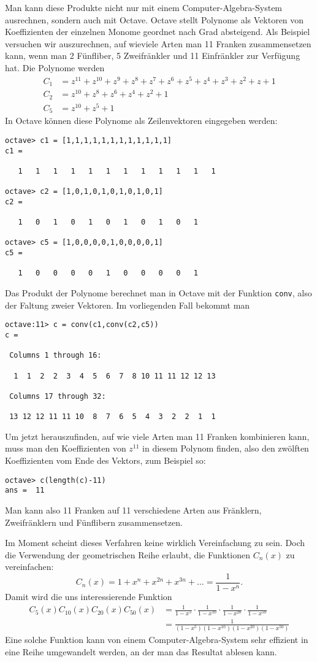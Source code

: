 Man kann diese Produkte nicht nur mit einem Computer-Algebra-System
ausrechnen, sondern auch mit Octave.
Octave stellt Polynome als
Vektoren von Koeffizienten der einzelnen Monome geordnet nach Grad
absteigend.
Als Beispiel versuchen wir auszurechnen, auf wieviele
Arten man 11 Franken zusammensetzen kann, wenn man 2 Fünfliber,
5 Zweifränkler und 11 Einfränkler zur Verfügung hat.
Die Polynome werden
\begin{align*}
C_1&=z^{11}+z^{10}+z^9+z^8+z^7+z^6+z^5+z^4+z^3+z^2+z+1\\
C_2&=z^{10}+z^8+z^6+z^4+z^2+1\\
C_5&=z^{10}+z^5+1
\end{align*}
In Octave können diese Polynome als Zeilenvektoren eingegeben werden:
\begin{verbatim}
octave> c1 = [1,1,1,1,1,1,1,1,1,1,1,1]
c1 =

   1   1   1   1   1   1   1   1   1   1   1   1

octave> c2 = [1,0,1,0,1,0,1,0,1,0,1]
c2 =

   1   0   1   0   1   0   1   0   1   0   1

octave> c5 = [1,0,0,0,0,1,0,0,0,0,1]
c5 =

   1   0   0   0   0   1   0   0   0   0   1
\end{verbatim}
Das Produkt der Polynome berechnet man in Octave mit der Funktion
{\tt conv}, also der Faltung zweier Vektoren.
Im vorliegenden Fall bekommt man
\begin{verbatim}
octave:11> c = conv(c1,conv(c2,c5))
c =

 Columns 1 through 16:

  1  1  2  2  3  4  5  6  7  8 10 11 11 12 12 13

 Columns 17 through 32:

 13 12 12 11 11 10  8  7  6  5  4  3  2  2  1  1
\end{verbatim}
Um jetzt herauszufinden, auf wie viele Arten man 11 Franken
kombinieren kann, muss man den Koeffizienten von $z^{11}$ in diesem
Polynom finden, also den zwölften Koeffizienten vom Ende des
Vektors, zum Beispiel so:
\begin{verbatim}
octave> c(length(c)-11)
ans =  11
\end{verbatim}
Man kann also 11 Franken auf 11 verschiedene Arten aus Fränklern,
Zweifränklern und Fünflibern zusammensetzen.

Im Moment scheint dieses Verfahren keine wirklich Vereinfachung
zu sein.
Doch die Verwendung der geometrischen Reihe erlaubt, die
Funktionen $C_n(x)$ zu vereinfachen:
\[
C_n(x)=1+x^n+x^{2n}+x^{3n}+\dots = \frac1{1-x^n}.
\]
Damit wird die uns interessierende Funktion
\begin{align*}
C_5(x) C_{10}(x) C_{20}(x) C_{50}(x)
&=
\frac1{1-x^5}\cdot
\frac1{1-x^{10}}\cdot
\frac1{1-x^{20}}\cdot
\frac1{1-x^{50}}
\\
&=
\frac1{
(1-x^5)
(1-x^{10})
(1-x^{20})
(1-x^{50})
}
\end{align*}
Eine solche Funktion kann von einem Computer-Algebra-System sehr effizient
in eine Reihe umgewandelt werden, an der man das Resultat ablesen kann.

